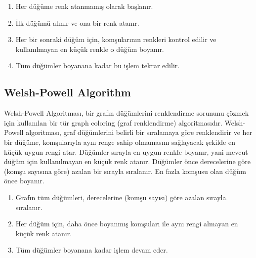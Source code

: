 \begin{enumerate}
    \item Her düğüme renk atanmamış olarak başlanır.
    \item İlk düğümü alınır ve ona bir renk atanır.
    \item Her bir sonraki düğüm için, komşularının renkleri kontrol edilir ve kullanılmayan en küçük renkle o düğüm boyanır.
    \item Tüm düğümler boyanana kadar bu işlem tekrar edilir.
\end{enumerate}

\newpage

\subsection{Welsh-Powell Algorithm}

Welsh-Powell Algoritması, bir grafın düğümlerini renklendirme sorununu çözmek için kullanılan bir tür graph coloring (graf renklendirme) algoritmasıdır. Welsh-Powell algoritması, graf düğümlerini belirli bir sıralamaya göre renklendirir ve her bir düğüme, komşularıyla aynı renge sahip olmamasını sağlayacak şekilde en küçük uygun rengi atar. Düğümler sırayla en uygun renkle boyanır, yani mevcut düğüm için kullanılmayan en küçük renk atanır. Düğümler önce derecelerine göre (komşu sayısına göre) azalan bir sırayla sıralanır. En fazla komşusu olan düğüm önce boyanır.

\begin{enumerate}
    \item Grafın tüm düğümleri, derecelerine (komşu sayısı) göre azalan sırayla sıralanır.
    \item Her düğüm için, daha önce boyanmış komşuları ile aynı rengi almayan en küçük renk atanır.
    \item Tüm düğümler boyanana kadar işlem devam eder.
\end{enumerate}

\newpage